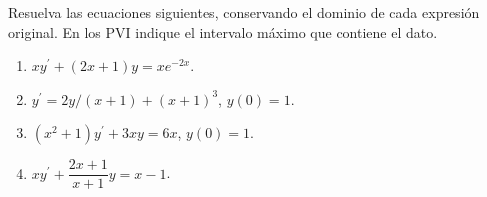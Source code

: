 Resuelva las ecuaciones siguientes, conservando el dominio de cada expresión original. En los PVI indique el intervalo máximo que contiene el dato.

\begin{enumerate}[label=(\alph*),ref=\alph*,leftmargin=*]
\item $xy^{\prime}+(2x+1)y=xe^{-2x}$.
\item $y^{\prime}=2y/(x+1)+(x+1)^3$, $y(0)=1$.
\item $(x^2+1)y^{\prime}+3xy=6x$, $y(0)=1$.
\item $xy^{\prime}+\dfrac{2x+1}{x+1}y=x-1$.
\end{enumerate}
